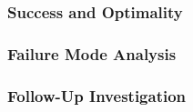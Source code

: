\subsubsection{Success and Optimality}
\label{sec:success}



\subsubsection{Failure Mode Analysis}
\label{sec:failures}



\subsubsection{Follow-Up Investigation}
\label{sec:follow-ups}

